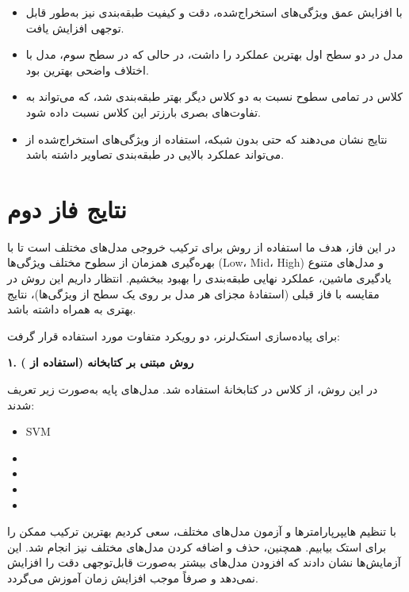 \documentclass[a4paper,12pt]{article}
\let\nobreaksection\section
\renewcommand{\section}{\nobreaksection}
\begin{document}
\begin{itemize}
	\item با افزایش عمق ویژگی‌های استخراج‌شده، دقت و کیفیت طبقه‌بندی نیز به‌طور قابل توجهی افزایش یافت.
	\item مدل  در دو سطح اول بهترین عملکرد را داشت، در حالی که در سطح سوم، مدل  با اختلاف واضحی بهترین بود.
	\item کلاس  در تمامی سطوح نسبت به دو کلاس دیگر بهتر طبقه‌بندی شد، که می‌تواند به تفاوت‌های بصری بارزتر این کلاس نسبت داده شود.
	\item نتایج نشان می‌دهند که حتی بدون  شبکه، استفاده از ویژگی‌های استخراج‌شده از  می‌تواند عملکرد بالایی در طبقه‌بندی تصاویر داشته باشد.
\end{itemize}
\section{نتایج فاز دوم}

در این فاز، هدف ما استفاده از روش  برای ترکیب خروجی مدل‌های مختلف است تا با بهره‌گیری همزمان از سطوح مختلف ویژگی‌ها (Low، Mid، High) و مدل‌های متنوع یادگیری ماشین، عملکرد نهایی طبقه‌بندی را بهبود ببخشیم. انتظار داریم این روش در مقایسه با فاز قبلی (استفادهٔ مجزای هر مدل بر روی یک سطح از ویژگی‌ها)، نتایج بهتری به همراه داشته باشد.

برای پیاده‌سازی استک‌لرنر، دو رویکرد متفاوت مورد استفاده قرار گرفت:

\textbf{۱. روش مبتنی بر کتابخانه (استفاده از )}

در این روش، از کلاس  در کتابخانهٔ  استفاده شد. مدل‌های پایه به‌صورت زیر تعریف شدند:

\begin{itemize}
    \item SVM
    \item {}
    \item {}
    \item {}
    \item {}
\end{itemize}

با تنظیم هایپرپارامترها و آزمون مدل‌های مختلف، سعی کردیم بهترین ترکیب ممکن را برای استک بیابیم. همچنین، حذف و اضافه کردن مدل‌های مختلف نیز انجام شد. این آزمایش‌ها نشان دادند که افزودن مدل‌های بیشتر به‌صورت قابل‌توجهی دقت را افزایش نمی‌دهد و صرفاً موجب افزایش زمان آموزش می‌گردد.
\end{document}
